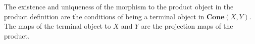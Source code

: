 The existence and uniqueness of the morphism to the product object in the product definition are the conditions of being a terminal object in $\mathbf{Cone}(X,Y)$. The maps of the terminal object to $X$ and $Y$ are the projection maps of the product.
